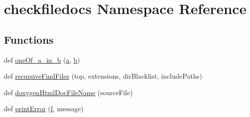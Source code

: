 \hypertarget{namespacecheckfiledocs}{}\section{checkfiledocs Namespace Reference}
\label{namespacecheckfiledocs}
\subsection*{Functions}
\begin{DoxyCompactItemize}
\item 
def \hyperlink{namespacecheckfiledocs_a618f7dbaa3b62343360a6ce73422ffa9}{one\+Of\+\_\+a\+\_\+in\+\_\+b} (\hyperlink{rfft2d_test_m_l_8m_a4124bc0a9335c27f086f24ba207a4912}{a}, \hyperlink{convtest_8m_a21ad0bd836b90d08f4cf640b4c298e7c}{b})
\item 
def \hyperlink{namespacecheckfiledocs_a110a1d3f50a97505ab88372f8c7d2895}{recursive\+Find\+Files} (top, extensions, dir\+Blacklist, include\+Paths)
\item 
def \hyperlink{namespacecheckfiledocs_a3a2ff5dff537f568ba8e1886a667db6b}{doxygen\+Html\+Doc\+File\+Name} (source\+File)
\item 
def \hyperlink{namespacecheckfiledocs_a0416cd5c106b068399d7d18cba699132}{print\+Error} (\hyperlink{checksum_8c_ae747d72a1a803f5ff4a4b2602857d93b}{f}, message)
\end{DoxyCompactItemize}
